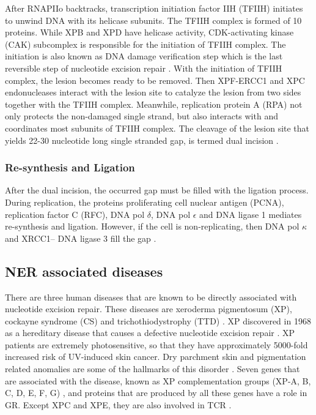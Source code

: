 After RNAPIIo backtracks, transcription initiation factor IIH (TFIIH) initiates to unwind DNA with its helicase subunits. The TFIIH complex is formed of 10 proteins. While XPB and XPD have helicase activity, CDK-activating kinase (CAK) subcomplex is responsible for the initiation of TFIIH complex. The initiation is also known as DNA damage verification step which is the last reversible step of nucleotide excision repair \citep{marteijn2014understanding}. With the initiation of TFIIH complex, the lesion becomes ready to be removed. Then XPF-ERCC1 and XPC endonucleases interact with the lesion site to catalyze the lesion from two sides together with the TFIIH complex. Meanwhile, replication protein A (RPA) not only protects the non-damaged single strand, but also interacts with and coordinates most subunits of TFIIH complex. The cleavage of the lesion site that yields 22-30 nucleotide long single stranded gap, is termed dual incision \citep{marteijn2014understanding}.

\subsubsection{Re-synthesis and Ligation}

After the dual incision, the occurred gap must be filled with the ligation process. During replication, the proteins proliferating cell nuclear antigen (PCNA), replication factor C (RFC), DNA pol $\delta$, DNA pol $\epsilon$ and DNA ligase 1 mediates re-synthesis and ligation. However, if the cell is non-replicating, then DNA pol $\kappa$ and XRCC1– DNA ligase 3 fill the gap \citep{marteijn2014understanding}.

\subsection{NER associated diseases}

There are three human diseases that are known to be directly associated with nucleotide excision repair. These diseases are xeroderma pigmentosum (XP), cockayne syndrome (CS) and trichothiodystrophy (TTD) \citep{de2000nucleotide,lehmann2003dna}. 
XP discovered in 1968 as a hereditary disease that causes a defective nucleotide excision repair \citep{cleaver1968defective}. XP patients are extremely photosensitive, so that they have approximately 5000-fold increased risk of UV-induced skin cancer. Dry parchment skin and pigmentation related anomalies are some of the hallmarks of this disorder \citep{de2000nucleotide}.  Seven genes that are associated with the disease, known as XP complementation groups (XP-A, B, C, D, E, F, G) \citep{cleaver1975xeroderma}, and proteins that are produced by all these genes have a role in GR. Except XPC and XPE, they are also involved in TCR \citep{van1995transcription}.  

